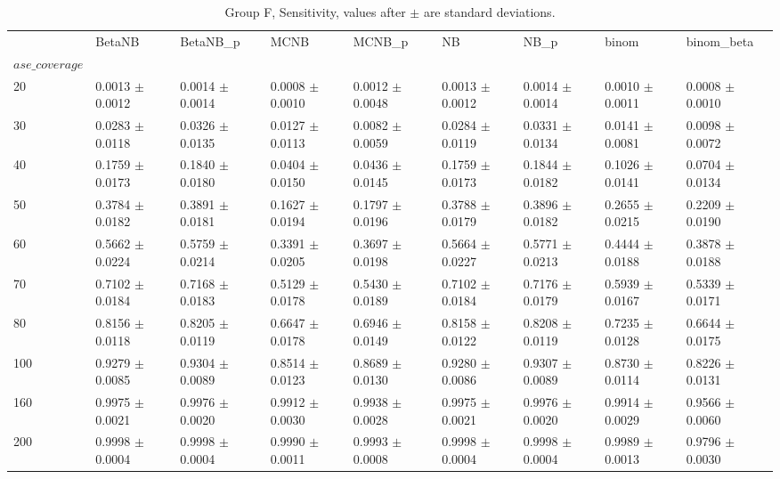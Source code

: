 \begin{table}[H]
\centering
\begin{adjustbox}{max width=\linewidth}
\begin{tabular}{lllllllll}
\toprule
 & BetaNB & BetaNB\_p & MCNB & MCNB\_p & NB & NB\_p & binom & binom\_beta \\
$ase\_coverage$ &  &  &  &  &  &  &  &  \\
\midrule
20 & 0.0013 $\pm$ 0.0012 & 0.0014 $\pm$ 0.0014 & 0.0008 $\pm$ 0.0010 & 0.0012 $\pm$ 0.0048 & 0.0013 $\pm$ 0.0012 & 0.0014 $\pm$ 0.0014 & 0.0010 $\pm$ 0.0011 & 0.0008 $\pm$ 0.0010 \\
30 & 0.0283 $\pm$ 0.0118 & 0.0326 $\pm$ 0.0135 & 0.0127 $\pm$ 0.0113 & 0.0082 $\pm$ 0.0059 & 0.0284 $\pm$ 0.0119 & 0.0331 $\pm$ 0.0134 & 0.0141 $\pm$ 0.0081 & 0.0098 $\pm$ 0.0072 \\
40 & 0.1759 $\pm$ 0.0173 & 0.1840 $\pm$ 0.0180 & 0.0404 $\pm$ 0.0150 & 0.0436 $\pm$ 0.0145 & 0.1759 $\pm$ 0.0173 & 0.1844 $\pm$ 0.0182 & 0.1026 $\pm$ 0.0141 & 0.0704 $\pm$ 0.0134 \\
50 & 0.3784 $\pm$ 0.0182 & 0.3891 $\pm$ 0.0181 & 0.1627 $\pm$ 0.0194 & 0.1797 $\pm$ 0.0196 & 0.3788 $\pm$ 0.0179 & 0.3896 $\pm$ 0.0182 & 0.2655 $\pm$ 0.0215 & 0.2209 $\pm$ 0.0190 \\
60 & 0.5662 $\pm$ 0.0224 & 0.5759 $\pm$ 0.0214 & 0.3391 $\pm$ 0.0205 & 0.3697 $\pm$ 0.0198 & 0.5664 $\pm$ 0.0227 & 0.5771 $\pm$ 0.0213 & 0.4444 $\pm$ 0.0188 & 0.3878 $\pm$ 0.0188 \\
70 & 0.7102 $\pm$ 0.0184 & 0.7168 $\pm$ 0.0183 & 0.5129 $\pm$ 0.0178 & 0.5430 $\pm$ 0.0189 & 0.7102 $\pm$ 0.0184 & 0.7176 $\pm$ 0.0179 & 0.5939 $\pm$ 0.0167 & 0.5339 $\pm$ 0.0171 \\
80 & 0.8156 $\pm$ 0.0118 & 0.8205 $\pm$ 0.0119 & 0.6647 $\pm$ 0.0178 & 0.6946 $\pm$ 0.0149 & 0.8158 $\pm$ 0.0122 & 0.8208 $\pm$ 0.0119 & 0.7235 $\pm$ 0.0128 & 0.6644 $\pm$ 0.0175 \\
100 & 0.9279 $\pm$ 0.0085 & 0.9304 $\pm$ 0.0089 & 0.8514 $\pm$ 0.0123 & 0.8689 $\pm$ 0.0130 & 0.9280 $\pm$ 0.0086 & 0.9307 $\pm$ 0.0089 & 0.8730 $\pm$ 0.0114 & 0.8226 $\pm$ 0.0131 \\
160 & 0.9975 $\pm$ 0.0021 & 0.9976 $\pm$ 0.0020 & 0.9912 $\pm$ 0.0030 & 0.9938 $\pm$ 0.0028 & 0.9975 $\pm$ 0.0021 & 0.9976 $\pm$ 0.0020 & 0.9914 $\pm$ 0.0029 & 0.9566 $\pm$ 0.0060 \\
200 & 0.9998 $\pm$ 0.0004 & 0.9998 $\pm$ 0.0004 & 0.9990 $\pm$ 0.0011 & 0.9993 $\pm$ 0.0008 & 0.9998 $\pm$ 0.0004 & 0.9998 $\pm$ 0.0004 & 0.9989 $\pm$ 0.0013 & 0.9796 $\pm$ 0.0030 \\
\bottomrule
\end{tabular}

\end{adjustbox}
\caption{Group F, Sensitivity, values after $\pm$ are standard deviations.}
\end{table}

